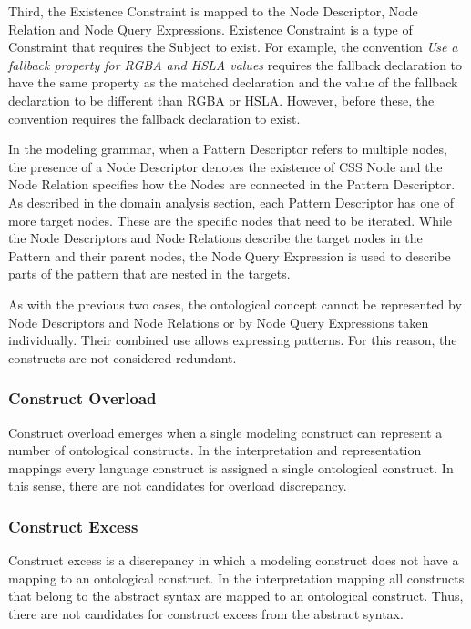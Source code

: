 Third, the Existence Constraint is mapped to the Node Descriptor, Node
Relation and Node Query Expressions. Existence Constraint is a type of
Constraint that requires the Subject to exist. For example, the convention
\textit{Use a fallback property for RGBA and HSLA values} requires the
fallback declaration to have the same property as the matched declaration and
the value of the fallback declaration to be different than RGBA or HSLA.
However, before these, the convention requires the fallback declaration to
exist.

In the modeling grammar, when a Pattern Descriptor refers to multiple nodes,
the presence of a Node Descriptor denotes the existence of CSS Node and the
Node Relation specifies how the Nodes are connected in the Pattern Descriptor.
As described in the domain analysis section, each Pattern Descriptor has one
of more target nodes. These are the specific nodes that need to be iterated. While
the Node Descriptors and Node Relations describe the target nodes in the
Pattern and their parent nodes, the Node Query Expression is used to describe
parts of the pattern that are nested in the targets.

As with the previous two cases, the ontological concept cannot be represented
by Node Descriptors and Node Relations or by Node Query Expressions taken
individually. Their combined use allows expressing patterns. For this reason,
the constructs are not considered redundant.


\subsubsection{Construct Overload}

Construct overload emerges when a single modeling construct can represent a
number of ontological constructs. In the interpretation and representation
mappings every language construct is assigned a single ontological construct.
In this sense, there are not candidates for overload discrepancy.

\subsubsection{Construct Excess}

Construct excess is a discrepancy in which a modeling construct does not have
a mapping to an ontological construct. In the interpretation mapping all
constructs that belong to the abstract syntax are mapped to an ontological
construct. Thus, there are not candidates for construct excess from the
abstract syntax.

